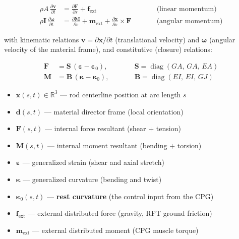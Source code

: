 \documentclass[11pt]{article}
\newcommand{\vect}[1]{\mathbf{#1}}
\newcommand{\mat}[1]{\mathbf{#1}}
\newcommand{\Real}{\mathbb{R}}
\newcommand{\ddt}[1]{\frac{\partial #1}{\partial t}}
\newcommand{\dds}[1]{\frac{\partial #1}{\partial s}}
\begin{document}
\begin{subequations}
\label{eq:cosserat-pdes}
\begin{alignat}{2}
  \rho A \,\ddt{\vect{v}}
    &= \dds{\vect{F}} + \vect{f}_{\text{ext}}
    &\qquad& \text{(linear momentum)}
  \label{eq:linear-momentum} \\[6pt]
  \rho \mat{I} \,\ddt{\bm{\omega}}
    &= \dds{\vect{M}} + \vect{m}_{\text{ext}}
       + \dds{\vect{x}} \times \vect{F}
    &\qquad& \text{(angular momentum)}
  \label{eq:angular-momentum}
\end{alignat}
\end{subequations}

\noindent
with kinematic relations $\vect{v} = \partial\vect{x}/\partial t$ (translational velocity) and $\bm{\omega}$ (angular velocity of the material frame), and constitutive (closure) relations:

\begin{subequations}
\label{eq:constitutive}
\begin{alignat}{2}
  \vect{F} &= \mat{S}\,(\bm{\varepsilon} - \bm{\varepsilon}_0),
    &\qquad& \mat{S} = \operatorname{diag}(GA,\, GA,\, EA)
  \label{eq:constitutive-force} \\[4pt]
  \vect{M} &= \mat{B}\,(\bm{\kappa} - \bm{\kappa}_0),
    &\qquad& \mat{B} = \operatorname{diag}(EI,\, EI,\, GJ)
  \label{eq:constitutive-moment}
\end{alignat}
\end{subequations}

\begin{itemize}
  \item $\vect{x}(s,t) \in \Real^3$ --- rod centerline position at arc length $s$
  \item $\vect{d}(s,t)$ --- material director frame (local orientation)
  \item $\vect{F}(s,t)$ --- internal force resultant (shear $+$ tension)
  \item $\vect{M}(s,t)$ --- internal moment resultant (bending $+$ torsion)
  \item $\bm{\varepsilon}$ --- generalized strain (shear and axial stretch)
  \item $\bm{\kappa}$ --- generalized curvature (bending and twist)
  \item $\bm{\kappa}_0(s,t)$ --- \textbf{rest curvature} (the control input from the CPG)
  \item $\vect{f}_{\text{ext}}$ --- external distributed force (gravity, RFT ground friction)
  \item $\vect{m}_{\text{ext}}$ --- external distributed moment (CPG muscle torque)
\end{itemize}
\end{document}

